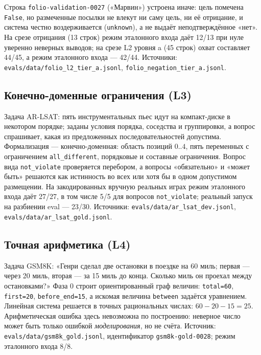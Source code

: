 \documentclass[11pt,a4paper]{article}
\begin{document}
Строка \texttt{folio-validation-0027} («Марвин») устроена иначе: цель помечена \texttt{False}, но размеченные посылки
не влекут ни саму цель, ни её отрицание, и система честно воздерживается (\texttt{unknown}), а не выдаёт неподтверждённое
«нет». На срезе отрицания (13 строк) режим эталонного входа даёт 12/13 при нуле уверенно неверных выводов; на срезе
L2 уровня a (45 строк) охват составляет 44/45, а режим эталонного входа — 42/44. Источники:
\texttt{evals/data/folio\_l2\_tier\_a.jsonl}, \texttt{folio\_negation\_tier\_a.jsonl}.

\subsection{Конечно-доменные ограничения (L3)}

Задача AR-LSAT: пять инструментальных пьес идут на компакт-диске в некотором порядке; заданы условия порядка,
соседства и группировки, а вопрос спрашивает, какая из предложенных последовательностей допустима. Формализация
 — конечно-доменная: область позиций $0..4$, пять переменных с ограничением \texttt{all\_different}, порядковые
и составные ограничения. Вопрос вида \texttt{not\_violate} проверяется перебором, а вопросы «обязательно» и
«может быть» решаются как истинность во всех или хотя бы в одном допустимом размещении. На закодированных вручную
реальных играх режим эталонного входа даёт 27/27, в том числе 5/5 для вопросов \texttt{not\_violate}; реальный
запуск на разбиении eval — 23/30. Источники: \texttt{evals/data/\allowbreak ar\_lsat\_dev.jsonl}, \texttt{evals/data/\allowbreak ar\_lsat\_gold.jsonl}.

\subsection{Точная арифметика (L4)}

Задача GSM8K: «Генри сделал две остановки в поездке на 60 миль; первая — через 20 миль, вторая — за 15 миль до конца.
Сколько миль он проехал между остановками?» Фаза 0 строит ориентированный граф величин:
\texttt{total=60}, \texttt{first=20}, \texttt{before\_end=15}, а искомая величина \texttt{between}
задаётся уравнением. Линейная система решается в точных рациональных числах: $60-20-15=25$. Арифметическая ошибка
здесь невозможна по построению: неверное число может быть только ошибкой \emph{моделирования}, но не счёта.
Источник: \texttt{evals/data/gsm8k\_gold.jsonl}, идентификатор \texttt{gsm8k-gold-0028}; режим эталонного входа 8/8.
\end{document}
